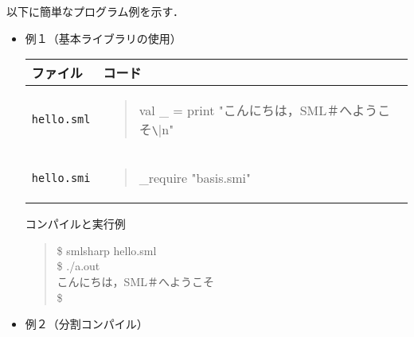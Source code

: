 \documentclass{jbook}
\newcommand{\code}[1]{\mbox{\large\tt #1}}
\newenvironment{program}{\begin{quote}\begin{tt}}%
                        {\end{tt}\end{quote}}
\begin{document}
	以下に簡単なプログラム例を示す．
\begin{itemize}
\item 例１（基本ライブラリの使用）

\begin{tabular}{|l|l|}
\hline
ファイル & コード
\\\hline
\hline
\begin{minipage}{0.5\textwidth}
\code{hello.sml}
\end{minipage}
&
\begin{minipage}{0.5\textwidth}
\begin{program}
val \_ = print "こんにちは，SML＃へようこそ\verb|\|n"
\end{program}
\end{minipage}
\\\hline
\begin{minipage}{0.5\textwidth}
\code{hello.smi}
\end{minipage}
&
\begin{minipage}{0.5\textwidth}
\begin{program}
\_require "basis.smi"
\end{program}
\end{minipage}
\\\hline
\end{tabular}

コンパイルと実行例
\begin{program}
 \$ smlsharp hello.sml\\
 \$ ./a.out\\
 こんにちは，SML＃へようこそ\\
 \$
\end{program}


\item 例２（分割コンパイル）


\end{itemize}
\end{document}
